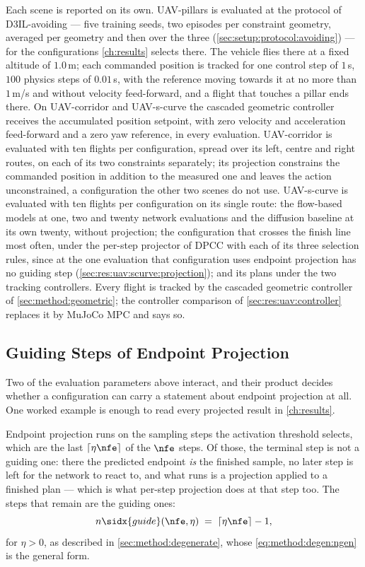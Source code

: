 Each scene is reported on its own. UAV-pillars is evaluated at the protocol of D3IL-avoiding --- five
training seeds, two episodes per constraint geometry, averaged per geometry and then over the three
(\autoref{sec:setup:protocol:avoiding}) --- for the configurations \autoref{ch:results} selects there.
The vehicle flies there at a fixed altitude of $1.0$\,m; each commanded position is tracked for one
control step of $1$\,s, $100$ physics steps of $0.01$\,s, with the reference moving towards it at no more
than $1$\,m/s and without velocity feed-forward, and a flight that touches a pillar ends there. On UAV-corridor
and UAV-s-curve the cascaded geometric controller receives the accumulated position setpoint, with zero velocity
and acceleration feed-forward and a zero yaw reference, in every evaluation. UAV-corridor is evaluated with ten flights per configuration, spread
over its left, centre and right routes, on each of its two constraints separately; its projection constrains the commanded position in addition to the measured one and leaves the
action unconstrained, a configuration the other two scenes do not use. UAV-s-curve is evaluated with ten
flights per configuration on its single route: the flow-based models at one, two and twenty network
evaluations and the diffusion baseline at its own twenty, without projection; the configuration that
crosses the finish line most often, under the per-step projector of \ac{DPCC} with each of its three
selection rules, since at the one evaluation that configuration uses endpoint projection has no guiding
step (\autoref{sec:res:uav:scurve:projection}); and its plans under the two tracking controllers. Every flight is tracked by the cascaded geometric
controller of \autoref{sec:method:geometric}; the controller comparison of
\autoref{sec:res:uav:controller} replaces it by MuJoCo MPC and says so.

\subsection{Guiding Steps of Endpoint Projection}\label{sec:setup:protocol:guiding}

Two of the evaluation parameters above interact, and their product decides whether a configuration can
carry a statement about endpoint projection at all. One worked example is enough to read every projected
result in \autoref{ch:results}.

Endpoint projection runs on the sampling steps the activation threshold selects, which are the last
$\lceil \eta\nfe \rceil$ of the $\nfe$ steps. Of those, the terminal step is not a guiding one: there the
predicted endpoint \emph{is} the finished sample, no later step is left for the network to react to, and
what runs is a projection applied to a finished plan --- which is what per-step projection does at that
step too. The steps that remain are the guiding ones:
\begin{equation*}
  n\sidx{guide}(\nfe,\eta) \;=\; \lceil \eta\nfe \rceil - 1 ,
\end{equation*}
for $\eta > 0$, as described in \autoref{sec:method:degenerate}, whose \eqref{eq:method:degen:ngen} is the general form.

